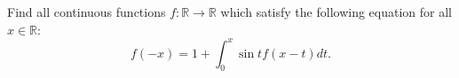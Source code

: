 \documentclass[11pt]{scrartcl}
\begin{document}
\begin{itemize}[label=,itemsep=0.4em,leftmargin=0em]
    \begin{btvn}
        Find all continuous functions $f: \mathbb{R} \rightarrow \mathbb{R}$ which satisfy the following equation for all $x \in \mathbb{R}$:
        $$f(-x) = 1 + \int _0 ^x \sin t f(x-t) dt.$$
    \end{btvn}
    \begin{comment}
        Replacing $t$ by $x-t$ in the given equation$$f(-x)=1+\int_0^x\sin(x-t)f(t)dt$$From here we can see $f(0)=1$. Now differentiating w.r.t. $x$$$-f'(-x)=\int_0^x\cos(x-t)f(t)dt$$From here we can see that $f'(0)=0$. Now again differentiating w.r.t. $x$$$f''(-x)=f(x)-\int_0^x\sin(x-t)f(t)dt=f(x)+1-f(-x)$$Now if we replace $x$ by $-x$ above, we get $\boxed{f''(x)=f(-x)+1-f(x)}$. Adding these two we must have $f''(x)+f''(-x)=2$. Now differentiating the boxed expression twice w.r.t. $x$, we have $f''''(x)=f''(-x)-f''(x)$. So eliminating $f''(-x)$ from these we have$$f''''(x)+2f''(x)-2=0$$along with initial conditions $f(0)=1$ and $f'(0)=0$ and $f''(0)=1$ and $f'''(0)=0$. Solving we have$$\boxed{f(x)=1+\frac{x^2}{2}}$$
    \end{comment}
\end{itemize}
    \newpage
\end{document}
